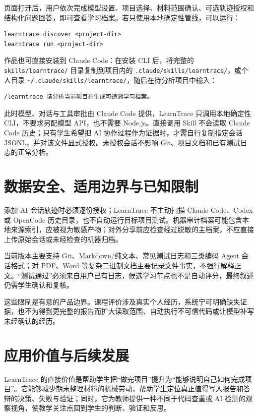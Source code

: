 \documentclass[UTF8,a4paper,12pt]{ctexart}
\begin{document}
页面打开后，用户依次完成模型设置、项目选择、材料范围确认、可选轨迹授权和结构化问题回答，即可查看学习档案。若只使用本地确定性管线，可以运行：

\begin{lstlisting}
learntrace discover <project-dir>
learntrace run <project-dir>
\end{lstlisting}

作品也可直接安装到 Claude Code：在安装 CLI 后，将完整的 \texttt{skills/learntrace/} 目录复制到项目内的 \texttt{.claude/skills/learntrace/}，或个人目录 \texttt{\textasciitilde/.claude/skills/learntrace/}，随后在待分析项目中输入：

\begin{lstlisting}
/learntrace 请分析当前项目并生成可追溯学习档案。
\end{lstlisting}

此时模型、对话与工具审批由 Claude Code 提供，LearnTrace 只调用本地确定性 CLI，不要求另配模型 API，也不需要 Node.js。直接调用 Skill 不会读取 Claude Code 历史；只有学生希望把 AI 协作过程作为证据时，才需自行复制指定会话 JSONL，并对该文件显式授权。未授权会话不影响 Git、项目文档和已有测试日志的正常分析。

\section{数据安全、适用边界与已知限制}

添加 AI 会话轨迹时必须逐份授权；LearnTrace 不主动扫描 Claude Code、Codex 或 OpenCode 历史目录，也不自动运行目标项目测试。机器审计档案可能包含本地来源索引，应被视为敏感产物；对外分享前应检查经过脱敏的主档案，不应直接上传原始会话或未经检查的机器归档。

当前版本主要支持 Git、Markdown/纯文本、常见测试日志和三类编码 Agent 会话格式；对 PDF、Word 等复杂二进制文档主要记录文件事实，不强行解释正文。“测试通过”必须来自用户已有日志，候选学习节点也不是自动评分，最终叙述仍需学生确认和复核。

这些限制是有意的产品边界。课程评价涉及真实个人经历，系统宁可明确缺失证据，也不为得到更完整的报告而扩大读取范围、自动执行不可信代码或让模型补写未经确认的经历。

\section{应用价值与后续发展}

LearnTrace 的直接价值是帮助学生把“做完项目”提升为“能够说明自己如何完成项目”。它能够减少期末整理材料的机械劳动，帮助学生定位真正值得写入报告和答辩的决策、失败与验证；同时，它为教师提供一种不同于代码查重或 AI 检测的观察视角，使教学关注点回到学生的判断、验证和反思。
\end{document}

